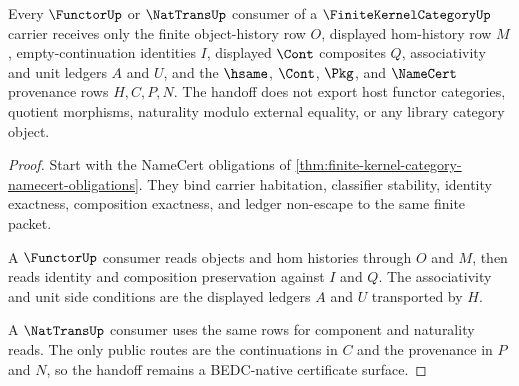 \begin{theorem}
\label{thm:finite-kernel-category-functor-nattrans-handoff}
Every $\FunctorUp$ or $\NatTransUp$ consumer of a $\FiniteKernelCategoryUp$ carrier receives only the finite object-history row $O$, displayed hom-history row $M$, empty-continuation identities $I$, displayed $\Cont$ composites $Q$, associativity and unit ledgers $A$ and $U$, and the $\hsame$, $\Cont$, $\Pkg$, and $\NameCert$ provenance rows $H,C,P,N$. The handoff does not export host functor categories, quotient morphisms, naturality modulo external equality, or any library category object.
\end{theorem}
\begin{proof}
Start with the NameCert obligations of \autoref{thm:finite-kernel-category-namecert-obligations}. They bind carrier habitation, classifier stability, identity exactness, composition exactness, and ledger non-escape to the same finite packet.

A $\FunctorUp$ consumer reads objects and hom histories through $O$ and $M$, then reads identity and composition preservation against $I$ and $Q$. The associativity and unit side conditions are the displayed ledgers $A$ and $U$ transported by $H$.

A $\NatTransUp$ consumer uses the same rows for component and naturality reads. The only public routes are the continuations in $C$ and the provenance in $P$ and $N$, so the handoff remains a BEDC-native certificate surface.
\end{proof}

